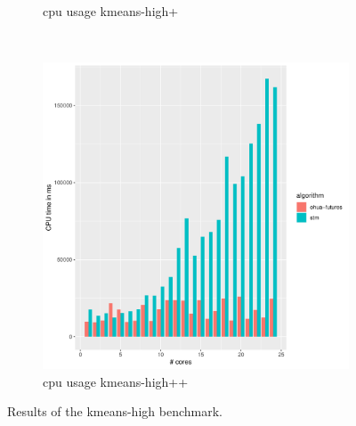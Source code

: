 \begin{figure}
\begin{subfigure}[t]{.32\textwidth}
        \caption{cpu usage kmeans-high+}%
    \end{subfigure}%
    ~
    \begin{subfigure}[t]{.32\textwidth}
        \includegraphics[width=\textwidth,keepaspectratio]{gfx/results/kmeans/kmeans-high++_cpu}
        \caption{cpu usage kmeans-high++}%
    \end{subfigure}%
    \caption{Results of the kmeans-high benchmark.}%
    \label{fig:evaulation:kmeans-high}
\end{figure}

